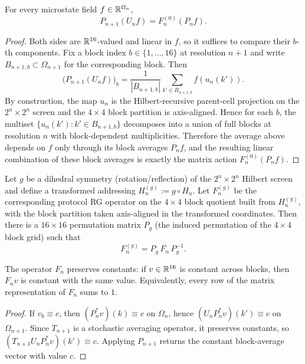\begin{lemma}\label{lem:rg_exact_coarse_intertwining}
\MathTag For every microstate field $f\in\mathbb{R}^{\Omega_n}$,
\[
P_{n+1}(U_nf)=F_n^{(0)}(P_nf).
\]
\end{lemma}
\begin{proof}
Both sides are $\mathbb{R}^{16}$-valued and linear in $f$, so it suffices to compare their $b$-th components.
Fix a block index $b\in\{1,\dots,16\}$ at resolution $n+1$ and write $B_{n+1,b}\subset\Omega_{n+1}$ for the corresponding block.
Then
\[
\bigl(P_{n+1}(U_nf)\bigr)_b
=\frac{1}{|B_{n+1,b}|}\sum_{k'\in B_{n+1,b}} f(u_n(k')).
\]
By construction, the map $u_n$ is the Hilbert-recursive parent-cell projection on the $2^n\times 2^n$ screen and the $4\times 4$ block partition is axis-aligned.
Hence for each $b$, the multiset $\{u_n(k'):k'\in B_{n+1,b}\}$ decomposes into a union of full blocks at resolution $n$ with block-dependent multiplicities.
Therefore the average above depends on $f$ only through its block averages $P_nf$, and the resulting linear combination of these block averages is exactly the matrix action $F_n^{(0)}(P_nf)$.
\end{proof}

\begin{lemma}\label{lem:rg_d4_layout_conjugacy}
\AuditTag Let $g$ be a dihedral symmetry (rotation/reflection) of the $2^n\times 2^n$ Hilbert screen and define a transformed addressing $H_n^{(g)}:=g\circ H_n$.
Let $F_n^{(g)}$ be the corresponding protocol RG operator on the $4\times 4$ block quotient built from $H_n^{(g)}$, with the block partition taken axis-aligned in the transformed coordinates.
Then there is a $16\times 16$ permutation matrix $P_g$ (the induced permutation of the $4\times 4$ block grid) such that
\[
F_n^{(g)}=P_g\,F_n\,P_g^{-1}.
\]
\end{lemma}

\begin{lemma}\label{lem:Fn_constant_preserving}
\MathTag The operator $F_n$ preserves constants: if $v\in\mathbb{R}^{16}$ is constant across blocks, then $F_nv$ is constant with the same value.
Equivalently, every row of the matrix representation of $F_n$ sums to $1$.
\end{lemma}
\begin{proof}
If $v_b\equiv c$, then $(P_n^\ast v)(k)\equiv c$ on $\Omega_n$, hence $(U_nP_n^\ast v)(k')\equiv c$ on $\Omega_{n+1}$.
Since $T_{n+1}$ is a stochastic averaging operator, it preserves constants, so $(T_{n+1}U_nP_n^\ast v)(k')\equiv c$.
Applying $P_{n+1}$ returns the constant block-average vector with value $c$.
\end{proof}

